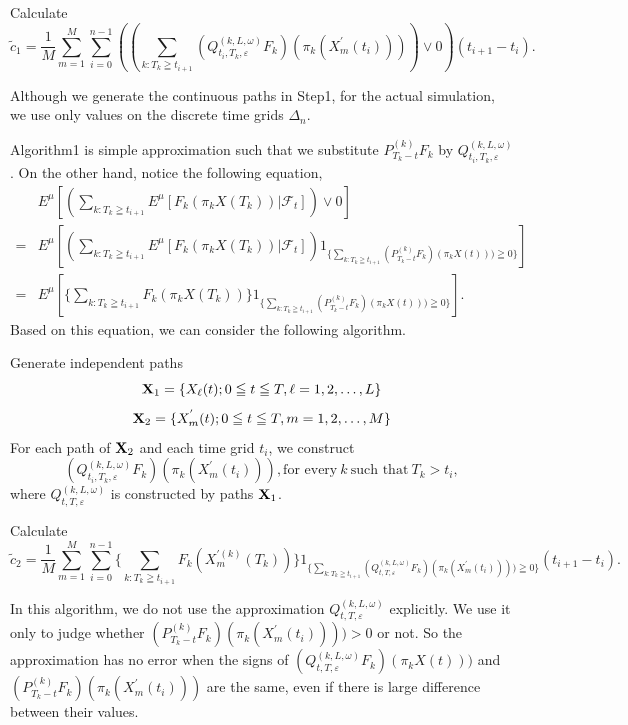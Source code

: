 \documentclass[12pt]{article}
\begin{document}
\noindent \qquad [Step3] Calculate
$$\tilde{c}_1=\frac{1}{M} \sum_{m=1}^M \sum_{i=0}^{n-1} (( \sum_{k:T_k\geqq t_{i+1}} (Q_{t_i,T_k,\varepsilon}^{(k,L,\omega)}F_k)(\pi_k(X^{'}_m(t_i))))\vee0)(t_{i+1}-t_i). $$

Although we generate the continuous paths in Step1, for the actual simulation, we use only values on the 
discrete time grids $\Delta_n$.

\noindent Algorithm1 is simple approximation such that  we substitute $P^{(k)}_{T_k-t} F_k$ by $Q_{t_i,T_k,\varepsilon}^{(k,L,\omega)}$.
On the other hand, notice the following equation,
\begin{align*}
&E^{\mu}[( \sum_{k:T_k\geqq t_{i+1}} E^{\mu}[F_k(\pi_k{X}(T_k)) |\mathcal{F}_t])\vee0]\\
=&E^{\mu}[( \sum_{k:T_k\geqq t_{i+1}} E^{\mu}[F_k(\pi_k{X}(T_k)) |\mathcal{F}_t])
 1_{\{\sum_{k:T_k\geqq t_{i+1}} (P^{(k)}_{T_k-t} F_k)(\pi_k{X}(t))) \geqq 0\}}]\\
=&E^{\mu}[ \{ \sum_{k:T_k\geqq t_{i+1}} F_k(\pi_k{X}(T_k))\}
 1_{\{\sum_{k:T_k\geqq t_{i+1}} (P^{(k)}_{T_k-t} F_k)(\pi_k{X}(t))) \geqq 0\}}].
\end{align*}
Based on this equation, we can consider the following algorithm.\\


\noindent \qquad[Step1] Generate independent paths 
$${\bf X}_1 = \{X_{\ell }(t); 0 \leqq t \leqq T, \ell =1,2,\ldots ,L\}$$
$${\bf X}_2=\{X^{'}_{m }(t); 0 \leqq t \leqq T,  m =1,2,\ldots ,M\}$$
\qquad [Step2]  For each path of ${\bf X}_2$ and each time grid $t_i$, we construct
$$(Q_{t_i,T_k,\varepsilon}^{(k,L,\omega)}F_k)(\pi_k(X^{'}_m(t_i))), \text{for every}\  k \  \text{such that} \ T_k > t_i ,$$
\qquad where $Q_{t,T,\varepsilon}^{(k,L,\omega)}$ is constructed by paths ${\bf X}_1$.

\noindent \qquad [Step3] Calculate
$$\tilde{c}_2= \frac{1}{M} \sum_{m=1}^M \sum_{i=0}^{n-1} \{ \sum_{k:T_k\geqq t_{i+1}}F_k(X_m^{'(k)}(T_k))\}
 1_{\{\sum_{k:T_k\geqq t_{i+1}} (Q_{t,T,\varepsilon}^{(k,L,\omega)}F_k)(\pi_k(X^{'}_m(t_i)))) \geqq 0\}}(t_{i+1}-t_i).$$ 
 
 \noindent In this algorithm, we do not use the approximation $Q_{t,T,\varepsilon}^{(k,L,\omega)}$ explicitly.
 We use it only to judge whether $(P^{(k)}_{T_k-t} F_k)(\pi_k(X^{'}_m(t_i))))>0$ or not. 
 So the approximation has no error when the signs of  $(Q_{t,T,\varepsilon}^{(k,L,\omega)} F_k)(\pi_k{X}(t)))$ and $(P^{(k)}_{T_k-t} F_k)(\pi_k(X^{'}_m(t_i)))$ are the same, even if there is large difference between their values.
\end{document}
